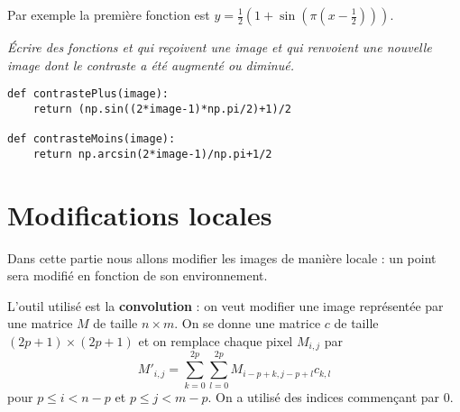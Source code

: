 Par exemple la première fonction est $y = \frac 12 \left(1+\sin\left(\pi\left(x-\frac 12\right)\right)\right)$.
\begin{Exercise}[title=Contraste]\it Écrire des fonctions  et  qui reçoivent une image et qui renvoient une nouvelle image dont le contraste a été augmenté ou diminué.
\end{Exercise}
\begin{Answer} 
\begin{lstlisting}
def contrastePlus(image):
    return (np.sin((2*image-1)*np.pi/2)+1)/2

def contrasteMoins(image):
    return np.arcsin(2*image-1)/np.pi+1/2
\end{lstlisting}
\end{Answer}
\section{Modifications locales}
Dans cette partie nous allons modifier les images de manière locale : un point sera modifié en fonction de son environnement.

L'outil utilisé est la {\bf convolution} : on veut modifier une image représentée par une matrice $M$ de taille $n\times m$. On se donne une matrice $c$ de taille $(2p+1)\times(2p+1)$ et on remplace chaque pixel $M_{i,j}$ par \[ M'_{i,j} = \sum_{k=0}^{2p}\sum_{l=0}^{2p}M_{i-p+k,j-p+l}c_{k,l}\] pour $p\le i < n-p$ et $p \le j < m-p$. On a utilisé des indices commençant par 0.

